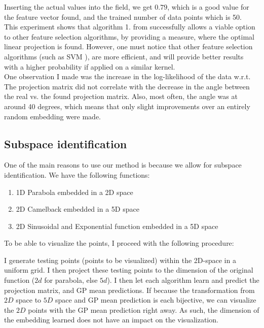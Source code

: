 Inserting the actual values into the field, we get $0.79$, which is a good value for the feature vector found, and the trained number of data points which is 50. \\
 
 This experiment shows that algorithm 1. from \citep{Tripathy} successfully allows a viable option to other feature selection algorithms, by providing a measure, where the optimal linear projection is found. 
 However, one must notice that other feature selection algorithms (such as SVM \citep{SVMFeature}), are more efficient, and will provide better results with a higher probability if applied on a similar kernel. \\
 
 One observation I made was the increase in the log-likelihood of the data w.r.t. The projection matrix did not correlate with the decrease in the angle between the real vs. the found projection matrix.
 Also, most often, the angle was at around 40 degrees, which means that only slight improvements over an entirely random embedding were made.


\subsection{Subspace identification}
One of the main reasons to use our method is because we allow for subspace identification.
We have the following functions:

\begin{enumerate}
\item 1D Parabola embedded in a 2D space
\item 2D Camelback embedded in a 5D space
\item 2D Sinusoidal and Exponential function embedded in a 5D space
\end{enumerate}

To be able to visualize the points, I proceed with the following procedure:

I generate testing points (points to be visualized) within the 2D-space in a uniform grid.
I then project these testing points to the dimension of the original function ($2d$ for parabola, else $5d$).
I then let each algorithm learn and predict the projection matrix, and GP mean predictions.
If because the transformation from $2D$ space to $5D$ space and GP mean prediction is each bijective, we can visualize the $2D$ points with the GP mean prediction right away.
As such, the dimension of the embedding learned does not have an impact on the visualization.

